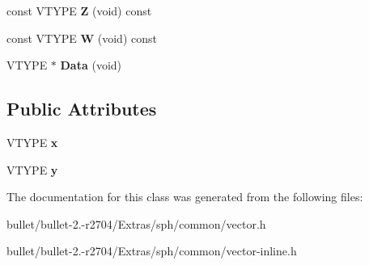 \begin{DoxyCompactItemize}
\item 
\hypertarget{class_vector2_d_i_adcbebaf8d9469bbf5333705e432ce0ec}{const V\+T\+Y\+P\+E {\bfseries Z} (void) const }\label{class_vector2_d_i_adcbebaf8d9469bbf5333705e432ce0ec}

\item 
\hypertarget{class_vector2_d_i_a2f6c6fd1a3e70c987edc45082d22e23b}{const V\+T\+Y\+P\+E {\bfseries W} (void) const }\label{class_vector2_d_i_a2f6c6fd1a3e70c987edc45082d22e23b}

\item 
\hypertarget{class_vector2_d_i_a9c7c53cb8244975ce62d6e917a6d8383}{V\+T\+Y\+P\+E $\ast$ {\bfseries Data} (void)}\label{class_vector2_d_i_a9c7c53cb8244975ce62d6e917a6d8383}

\end{DoxyCompactItemize}
\subsection*{Public Attributes}
\begin{DoxyCompactItemize}
\item 
\hypertarget{class_vector2_d_i_ad84105b823e7441116fc325725e153bd}{V\+T\+Y\+P\+E {\bfseries x}}\label{class_vector2_d_i_ad84105b823e7441116fc325725e153bd}

\item 
\hypertarget{class_vector2_d_i_a29af08a760bd0030bf24f3cb646fc9a1}{V\+T\+Y\+P\+E {\bfseries y}}\label{class_vector2_d_i_a29af08a760bd0030bf24f3cb646fc9a1}

\end{DoxyCompactItemize}


The documentation for this class was generated from the following files\+:\begin{DoxyCompactItemize}
\item 
bullet/bullet-\/2.-\/r2704/\+Extras/sph/common/vector.\+h\item 
bullet/bullet-\/2.-\/r2704/\+Extras/sph/common/vector-\/inline.\+h\end{DoxyCompactItemize}
